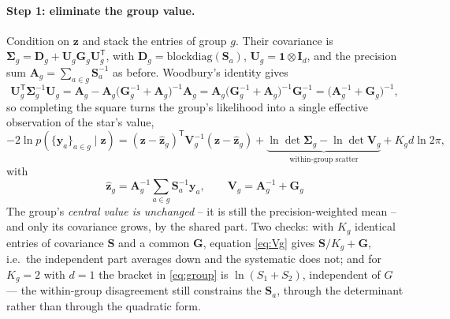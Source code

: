 \documentclass[11pt,a4paper]{article}
\newcommand{\bv}[1]{\boldsymbol{#1}}          %
\newcommand{\bM}[1]{\boldsymbol{#1}}          %
\newcommand{\T}{^{\mathsf T}}
\newcommand{\lndet}{\ln\det}
\begin{document}
\paragraph{Step 1: eliminate the group value.} Condition on $\bv z$ and stack the
entries of group $g$. Their covariance is $\bM\Sigma_g = \bM D_g + \bM U_g\bM G_g\bM U_g\T$,
with $\bM D_g = \mathrm{blockdiag}(\bM S_a)$, $\bM U_g = \bv 1\otimes \bM I_d$, and the
precision sum $\bM A_g = \sum_{a\in g}\bM S_a^{-1}$ as before. Woodbury's identity gives
\begin{equation}
  \bM U_g\T\bM\Sigma_g^{-1}\bM U_g
  = \bM A_g - \bM A_g\big(\bM G_g^{-1}+\bM A_g\big)^{-1}\bM A_g
  = \bM A_g\big(\bM G_g^{-1}+\bM A_g\big)^{-1}\bM G_g^{-1}
  = \big(\bM A_g^{-1}+\bM G_g\big)^{-1},
\end{equation}
so completing the square turns the group's likelihood into a single effective
observation of the star's value,
\begin{equation}
  -2\ln p(\{\bv y_a\}_{a\in g}\mid \bv z)
  = (\bv z-\hat{\bv z}_g)\T \bM V_g^{-1}(\bv z-\hat{\bv z}_g)
  + \underbrace{\lndet\bM\Sigma_g - \lndet\bM V_g}_{\text{within-group scatter}}
  + K_g d\ln 2\pi ,
  \label{eq:group}
\end{equation}
with
\begin{equation}
  \boxed{\ \hat{\bv z}_g = \bM A_g^{-1}\sum_{a\in g}\bM S_a^{-1}\bv y_a,
  \qquad \bM V_g = \bM A_g^{-1} + \bM G_g\ }
  \label{eq:Vg}
\end{equation}
The group's \emph{central value is unchanged} -- it is still the precision-weighted
mean -- and only its covariance grows, by the shared part. Two checks: with
$K_g$ identical entries of covariance $\bM S$ and a common $\bM G$, equation
\eqref{eq:Vg} gives $\bM S/K_g+\bM G$, i.e.\ the independent part averages down
and the systematic does not; and for $K_g=2$ with $d=1$ the bracket in
\eqref{eq:group} is $\ln(S_1+S_2)$, independent of $G$ --- the within-group
disagreement still constrains the $\bM S_a$, through the determinant rather than
through the quadratic form.
\end{document}
